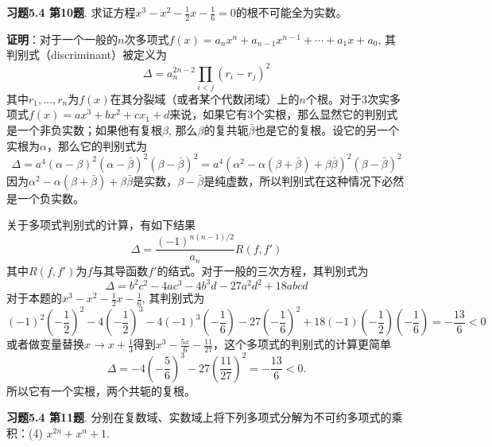 
\renewcommand{\newpageorvspace}{\vspace{2em}}

\date{2021-12-24  第七次习题课}



\maketitle

{\bf 习题5.4 第10题}. 求证方程$x^3 - x^2 - \frac{1}{2}x - \frac{1}{6} = 0$的根不可能全为实数。

{\bf 证明}：对于一个一般的$n$次多项式$f(x) = a_{n}x^{n}+a_{n-1}x^{n-1}+\cdots +a_{1}x+a_{0}$, 其判别式（discriminant）被定义为
$$\Delta = a_n^{2n-2} \prod_{i< j} (r_i - r_j)^2$$
其中$r_1,\ldots, r_n$为$f(x)$在其分裂域（或者某个代数闭域）上的$n$个根。对于3次实多项式$f(x) = ax^3+bx^2+cx_1+d$来说，如果它有3个实根，那么显然它的判别式是一个非负实数；如果他有复根$\beta$, 那么$\beta$的复共轭$\bar{\beta}$也是它的复根。设它的另一个实根为$\alpha$，那么它的判别式为
$$\Delta = a^4 (\alpha-\beta)^2(\alpha-\bar{\beta})^2(\beta-\bar{\beta})^2 = a^4 (\alpha^2-\alpha(\beta+\bar{\beta})+\beta\bar{\beta})^2 (\beta-\bar{\beta})^2$$
因为$\alpha^2-\alpha(\beta+\bar{\beta})+\beta\bar{\beta}$是实数，$\beta-\bar{\beta}$是纯虚数，所以判别式在这种情况下必然是一个负实数。

关于多项式判别式的计算，有如下结果
$$\Delta = \frac{(-1)^{n(n-1)/2}}{a_n} R(f,f')$$
其中$R(f,f')$为$f$与其导函数$f'$的结式。对于一般的三次方程，其判别式为
$$\Delta = b^{2}c^{2}-4ac^{3}-4b^{3}d-27a^{2}d^{2}+18abcd$$
对于本题的$x^3 - x^2 - \frac{1}{2}x - \frac{1}{6}$, 其判别式为
$$(-1)^2(-\frac{1}{2})^2 - 4(-\frac{1}{2})^3 - 4(-1)^3(-\frac{1}{6}) - 27(-\frac{1}{6})^2 + 18(-1)(-\frac{1}{2})(-\frac{1}{6}) = -\frac{13}{6} < 0$$
或者做变量替换$x\to x+\frac{1}{3}$得到$x^{3} - \frac{5 x}{6} - \frac{11}{27}$，这个多项式的判别式的计算更简单
$$\Delta = -4(-\frac{5}{6})^3 - 27 (\frac{11}{27})^2 = -\frac{13}{6} < 0.$$
所以它有一个实根，两个共轭的复根。

\newpageorvspace


{\bf 习题5.4 第11题}. 分别在复数域、实数域上将下列多项式分解为不可约多项式的乘积：(4) $x^{2n} + x^n + 1$.

